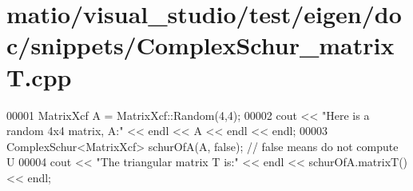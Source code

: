 \hypertarget{matio_2visual__studio_2test_2eigen_2doc_2snippets_2_complex_schur__matrix_t_8cpp_source}{}\section{matio/visual\+\_\+studio/test/eigen/doc/snippets/\+Complex\+Schur\+\_\+matrixT.cpp}
\label{matio_2visual__studio_2test_2eigen_2doc_2snippets_2_complex_schur__matrix_t_8cpp_source}

\begin{DoxyCode}
00001 MatrixXcf A = MatrixXcf::Random(4,4);
00002 cout << \textcolor{stringliteral}{"Here is a random 4x4 matrix, A:"} << endl << A << endl << endl;
00003 ComplexSchur<MatrixXcf> schurOfA(A, \textcolor{keyword}{false}); \textcolor{comment}{// false means do not compute U}
00004 cout << \textcolor{stringliteral}{"The triangular matrix T is:"} << endl << schurOfA.matrixT() << endl;
\end{DoxyCode}
